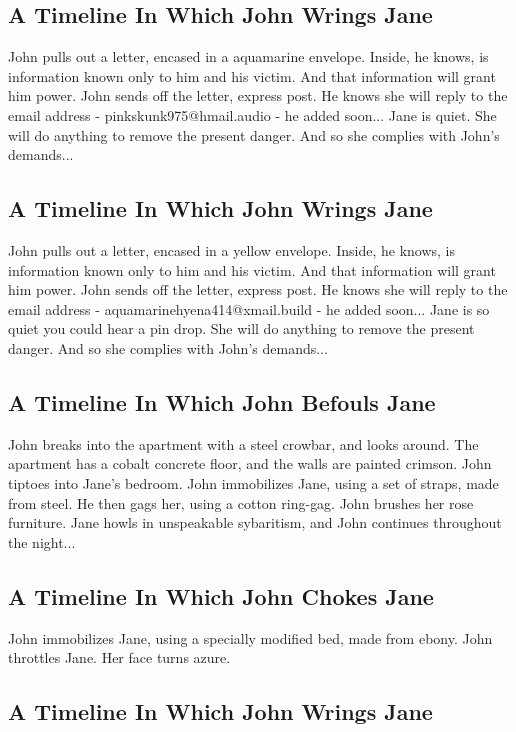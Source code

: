 \documentclass{article}
\begin{document}
\subsection{A Timeline In Which John Wrings Jane}


John pulls out a letter, encased in a aquamarine envelope. Inside, he knows, is information known only to him and his victim. And that information will grant him power.
John sends off the letter, express post. He knows she will reply to the email address {-} pinkskunk975@hmail.audio {-} he added soon...
Jane is quiet. She will do anything to remove the present danger. And so she complies with John's demands...
\subsection{A Timeline In Which John Wrings Jane}


John pulls out a letter, encased in a yellow envelope. Inside, he knows, is information known only to him and his victim. And that information will grant him power.
John sends off the letter, express post. He knows she will reply to the email address {-} aquamarinehyena414@xmail.build {-} he added soon...
Jane is so quiet you could hear a pin drop. She will do anything to remove the present danger. And so she complies with John's demands...
\subsection{A Timeline In Which John Befouls Jane}


John breaks into the apartment with a steel crowbar, and looks around.
The apartment has a cobalt concrete floor, and the walls are painted crimson.
John tiptoes into Jane's bedroom.
John immobilizes Jane, using a set of straps, made from steel.
He then gags her, using a cotton ring{-}gag.
John brushes her rose furniture.
Jane howls in unspeakable sybaritism, and John continues throughout the night...
\subsection{A Timeline In Which John Chokes Jane}


John immobilizes Jane, using a specially modified bed, made from ebony.
John throttles Jane.
Her face turns azure.
\subsection{A Timeline In Which John Wrings Jane}
\end{document}
